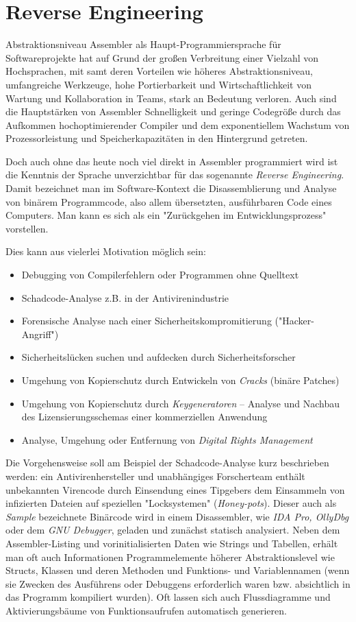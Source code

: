 \section{Reverse Engineering}
Abstraktionsniveau
Assembler als Haupt-Programmiersprache für Softwareprojekte hat auf Grund der großen Verbreitung einer Vielzahl von Hochsprachen, mit samt deren Vorteilen wie höheres Abstraktionsniveau, umfangreiche Werkzeuge, hohe Portierbarkeit und Wirtschaftlichkeit von Wartung und Kollaboration in Teams, stark an Bedeutung verloren. Auch sind die Hauptstärken von Assembler Schnelligkeit und geringe Codegröße durch das Aufkommen hochoptimierender Compiler und dem exponentiellem Wachstum von Prozessorleistung und Speicherkapazitäten in den Hintergrund getreten.

Doch auch ohne das heute noch viel direkt in Assembler programmiert wird ist die Kenntnis der Sprache unverzichtbar für das sogenannte \emph{Reverse Engineering}. Damit bezeichnet man im Software-Kontext die Disassemblierung und Analyse von binärem Programmcode, also allem übersetzten, ausführbaren Code eines Computers. Man kann es sich als ein "Zurückgehen im Entwicklungsprozess" vorstellen.\cite{Warden1992}

Dies kann aus vielerlei Motivation möglich sein:
\begin{itemize}
\item Debugging von Compilerfehlern oder Programmen ohne Quelltext
\item Schadcode-Analyse z.B. in der Antivirenindustrie
\item Forensische Analyse nach einer Sicherheitskompromitierung ("Hacker-Angriff")
\item Sicherheitslücken suchen und aufdecken durch Sicherheitsforscher
\item Umgehung von Kopierschutz durch Entwickeln von \emph{Cracks} (binäre Patches)
\item Umgehung von Kopierschutz durch \emph{Keygeneratoren} – Analyse und Nachbau des Lizensierungsschemas einer kommerziellen Anwendung
\item Analyse, Umgehung oder Entfernung von \emph{Digital Rights Management}
\end{itemize}

Die Vorgehensweise soll am Beispiel der Schadcode-Analyse kurz beschrieben werden: ein Antivirenhersteller und unabhängiges Forscherteam enthält unbekannten Virencode durch Einsendung eines Tipgebers dem Einsammeln von infizierten Dateien auf speziellen "Locksystemen" (\emph{Honey-pots}). Dieser auch als \emph{Sample} bezeichnete Binärcode wird in einem Disassembler, wie \emph{IDA Pro, OllyDbg} oder dem \emph{GNU Debugger}\cite{disasm}, geladen und zunächst statisch analysiert. Neben dem Assembler-Listing und vorinitialisierten Daten wie Strings und Tabellen, erhält man oft auch Informationen Programmelemente höherer Abstraktionslevel wie Structs, Klassen und deren Methoden und Funktions- und Variablennamen (wenn sie Zwecken des Ausführens oder Debuggens erforderlich waren bzw. absichtlich in das Programm kompiliert wurden).
Oft lassen sich auch Flussdiagramme und Aktivierungsbäume von Funktionsaufrufen automatisch generieren.

